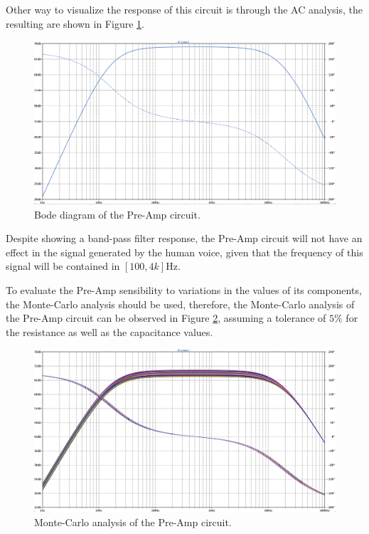 Other way to visualize the response of this circuit is through the AC analysis, the resulting are shown in Figure \ref{fig:SimAmpFreq}.

\begin{figure}[H]
    \centering
    \includegraphics*[scale = 0.25]{Images/SimAmpFreq.png}
    \caption{Bode diagram of the Pre-Amp circuit.}
    \label{fig:SimAmpFreq}
\end{figure}

Despite showing a band-pass filter response, the Pre-Amp circuit will not have an effect in the signal generated by the human voice, given that the frequency of this signal will be contained in $[100, 4k]\si{\hertz}$.

To evaluate the Pre-Amp sensibility to variations in the values of its components, the Monte-Carlo analysis should be used, therefore, the Monte-Carlo analysis of the Pre-Amp circuit can be observed in Figure \ref{fig:Monte-carloPreAmp}, assuming a tolerance of $5\%$ for the resistance as well as the capacitance values.

\begin{figure}[H]
    \centering
    \includegraphics*[scale = 0.25]{Images/Monte-carloPreAmp.png}
    \caption{Monte-Carlo analysis of the Pre-Amp circuit.}
    \label{fig:Monte-carloPreAmp}
\end{figure}

